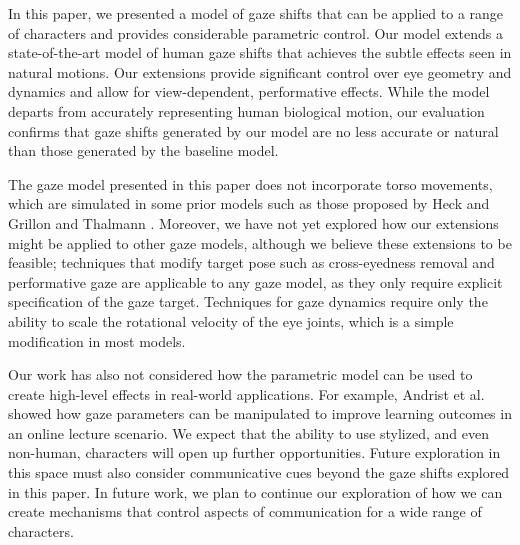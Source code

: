 In this paper, we presented a model of gaze shifts that can be applied to a range of characters and provides considerable parametric control. Our model extends a state-of-the-art model of human gaze shifts that achieves the subtle effects seen in natural motions. Our extensions provide significant control over eye geometry and dynamics and allow for view-dependent, performative effects. While the model departs from accurately representing human biological motion, our evaluation confirms that gaze shifts generated by our model are no less accurate or natural than those generated by the baseline model.

The gaze model presented in this paper does not incorporate torso movements, which are simulated in some prior models such as those proposed by Heck \cite{heck2007automated} and Grillon and Thalmann \cite{grillon2009crowds}. Moreover, we have not yet explored how our extensions might be applied to other gaze models, although we believe these extensions to be feasible; techniques that modify target pose such as cross-eyedness removal and performative gaze are applicable to any gaze model, as they only require explicit specification of the gaze target. Techniques for gaze dynamics require only the ability to scale the rotational velocity of the eye joints, which is a simple modification in most models.

Our work has also not considered how the parametric model can be used to create high-level effects in real-world applications. For example, Andrist et al. \cite{andrist2012headeye} showed how gaze parameters can be manipulated to improve learning outcomes in an online lecture scenario. We expect that the ability to use stylized, and even non-human, characters will open up further opportunities. Future exploration in this space must also consider communicative cues beyond the gaze shifts explored in this paper. In future work, we plan to continue our exploration of how we can create mechanisms that control aspects of communication for a wide range of characters.
